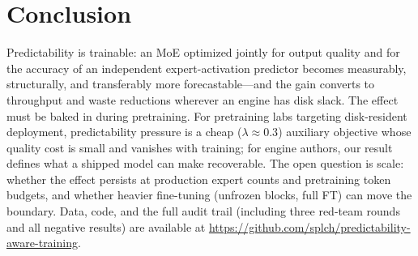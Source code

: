 \documentclass[10pt,letterpaper]{article}
\begin{document}
\section{Conclusion}
\label{sec:conclusion}

Predictability is trainable: an MoE optimized jointly for output quality and for the accuracy of an independent expert-activation predictor becomes measurably, structurally, and transferably more forecastable---and the gain converts to throughput and waste reductions wherever an engine has disk slack. The effect must be baked in during pretraining. For pretraining labs targeting disk-resident deployment, predictability pressure is a cheap ($\lambda \approx 0.3$) auxiliary objective whose quality cost is small and vanishes with training; for engine authors, our result defines what a shipped model can make recoverable. The open question is scale: whether the effect persists at production expert counts and pretraining token budgets, and whether heavier fine-tuning (unfrozen blocks, full FT) can move the boundary. Data, code, and the full audit trail (including three red-team rounds and all negative results) are available at \url{https://github.com/splch/predictability-aware-training}.



\end{document}
